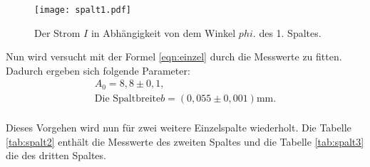 \begin{figure}
  \centering
  \texttt{[image: spalt1.pdf]}
  \caption{ Der Strom $I$ in Abhängigkeit von dem Winkel $phi$. des 1. Spaltes.}
  \label{fig:spalt1}
\end{figure}

Nun wird versucht mit der Formel \eqref{eqn:einzel} durch die Messwerte zu fitten.
Dadurch ergeben sich folgende Parameter:
\begin{align*}
  A_0=8,8\pm0,1,\\
  \text{Die Spaltbreite} b=(0,055\pm0,001)\si{\milli\meter}.\\
\end{align*}

Dieses Vorgehen wird nun für zwei weitere Einzelspalte wiederholt.
Die Tabelle \ref{tab:spalt2} enthält die Messwerte des zweiten Spaltes
und die Tabelle \ref{tab:spalt3} die des dritten Spaltes.




